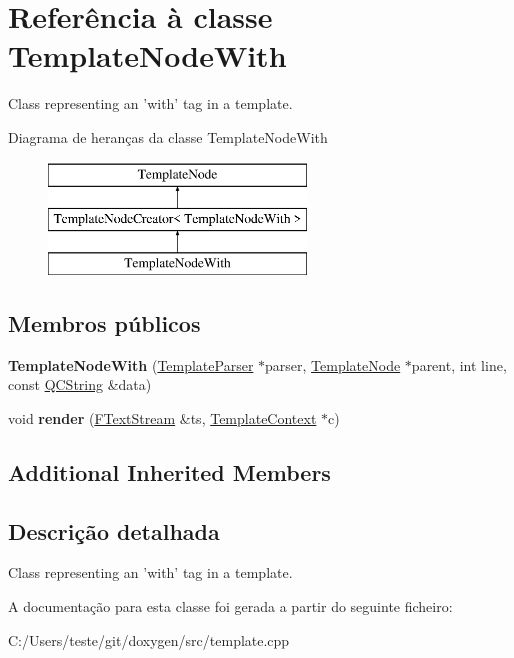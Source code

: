 \hypertarget{class_template_node_with}{\section{Referência à classe Template\-Node\-With}
\label{class_template_node_with}
}


Class representing an 'with' tag in a template.  


Diagrama de heranças da classe Template\-Node\-With\begin{figure}[H]
\begin{center}
\leavevmode
\includegraphics[height=3.000000cm]{class_template_node_with}
\end{center}
\end{figure}
\subsection*{Membros públicos}
\begin{DoxyCompactItemize}
\item 
\hypertarget{class_template_node_with_afd7a01f928d88e232c55049497f0f9df}{{\bfseries Template\-Node\-With} (\hyperlink{class_template_parser}{Template\-Parser} $\ast$parser, \hyperlink{class_template_node}{Template\-Node} $\ast$parent, int line, const \hyperlink{class_q_c_string}{Q\-C\-String} \&data)}\label{class_template_node_with_afd7a01f928d88e232c55049497f0f9df}

\item 
\hypertarget{class_template_node_with_aaa6575d8c79eeaa49f849f1ca1d6b228}{void {\bfseries render} (\hyperlink{class_f_text_stream}{F\-Text\-Stream} \&ts, \hyperlink{class_template_context}{Template\-Context} $\ast$c)}\label{class_template_node_with_aaa6575d8c79eeaa49f849f1ca1d6b228}

\end{DoxyCompactItemize}
\subsection*{Additional Inherited Members}


\subsection{Descrição detalhada}
Class representing an 'with' tag in a template. 

A documentação para esta classe foi gerada a partir do seguinte ficheiro\-:\begin{DoxyCompactItemize}
\item 
C\-:/\-Users/teste/git/doxygen/src/template.\-cpp\end{DoxyCompactItemize}
